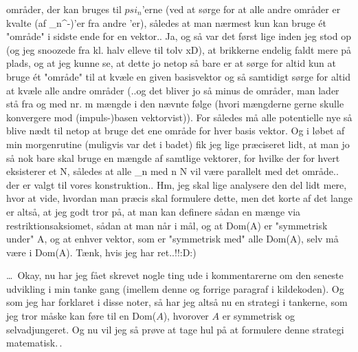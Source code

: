 \documentclass{report}
\begin{document}
områder, der kan bruges til $psi_n$'erne (ved at sørge for at alle andre områder er kvalte (af \psi_n^-)'er fra andre \psi'er), således at man nærmest kun kan bruge ét "område" i sidste ende for en vektor.. Ja, og så var det først lige inden jeg stod op (og jeg snoozede fra kl. halv elleve til tolv xD), at brikkerne endelig faldt mere på plads, og at jeg kunne se, at dette jo netop så bare er at sørge for altid kun at bruge ét "område" til at kvæle en given basisvektor og så samtidigt sørge for altid at kvæle alle andre områder (..og det bliver jo så minus de områder, man lader stå fra og med nr. m mængde i den nævnte følge (hvori mængderne gerne skulle konvergere mod (impuls-)basen vektorvist)). For således må alle potentielle nye \psi så blive nædt til netop at bruge det ene område for hver basis vektor. Og i løbet af min morgenrutine (muligvis var det i badet) fik jeg lige præciseret lidt, at man jo så nok bare skal bruge en mængde af samtlige vektorer, for hvilke der for hvert \varepsilon eksisterer et N, således at alle \psi_n med n \geq N vil være parallelt med det område.. der er valgt til vores konstruktion.. Hm, jeg skal lige analysere den del lidt mere, hvor at vide, hvordan man præcis skal formulere dette, men det korte af det lange er altså, at jeg godt tror på, at man kan definere sådan en mænge via restriktionsaksiomet, sådan at man når i mål, og at Dom(A) er "symmetrisk under" A, og at enhver vektor, som er "symmetrisk med" alle \psi\in Dom(A), selv må være i Dom(A). Tænk, hvis jeg har ret..!!:D:) 



\ldots\ Okay, nu har jeg fået skrevet nogle ting ude i kommentarerne om den seneste udvikling i min tanke gang (imellem denne og forrige paragraf i kildekoden). Og som jeg har forklaret i disse noter, så har jeg altså nu en strategi i tankerne, som jeg tror måske kan føre til en Dom($A$), hvorover $A$ er symmetrisk og selvadjungeret. Og nu vil jeg så prøve at tage hul på at formulere denne strategi matematisk.\,.
\end{document}
